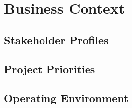 
\section{Business Context}

\subsection{Stakeholder Profiles}

\subsection{Project Priorities}

\subsection{Operating Environment}
